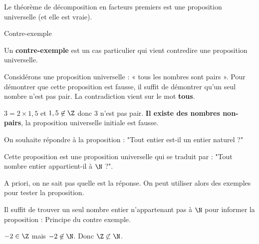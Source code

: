 \begin{pageCours}
 
\begin{Rq} 
  Le théorème de décomposition en facteurs premiers est une proposition
  universelle (et elle est vraie).
  

\end{Rq}
 
\begin{DefT}{Contre-exemple}

Un \textbf{contre-exemple} est un cas particulier qui vient contredire une proposition universelle. 

\end{DefT}
 

\begin{Ex} 

Considérons une proposition universelle : « tous les nombres sont pairs ». Pour démontrer que cette proposition est fausse, il suffit de démontrer qu'un seul nombre n'est pas pair. La contradiction vient sur le mot \textbf{tous}.

$3=2\times1,5$ et $1,5 \not\in\Z$ donc $3$ n'est pas pair. \textbf{Il existe
  des nombres non-pairs}, la proposition universelle initiale est fausse. 

\end{Ex}
 

\begin{LogT}{On souhaite répondre à la proposition : "Tout entier est-il un entier naturel ?"  }

Cette proposition est une proposition universelle qui se traduit par : "Tout nombre entier appartient-il à $\N$ ?". 

A priori, on ne sait pas quelle est la réponse. On peut utiliser alors des exemples pour tester la proposition.

Il suffit de trouver un seul nombre entier n'appartenant pas à $\N$ pour informer la proposition : Principe du contre exemple. 


$-2 \in \Z$ mais $-2 \not \in \N$. Donc $\Z \not \subset \N$.

\end{LogT}


\end{pageCours} 
